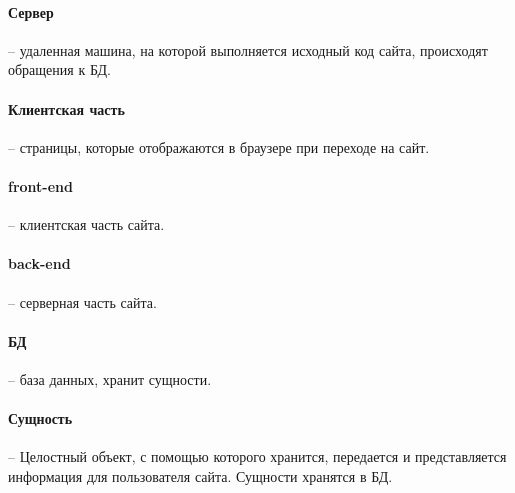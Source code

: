 \paragraph{Сервер} -- удаленная машина, на которой выполняется исходный код сайта, происходят обращения к БД.
\paragraph{Клиентская часть} -- страницы, которые отображаются в браузере при переходе на сайт.
\paragraph{front-end} -- клиентская часть сайта.
\paragraph{back-end} -- серверная часть сайта.
\paragraph{БД} -- база данных, хранит сущности.
\paragraph{Сущность} -- Целостный объект, с помощью которого хранится, передается и представляется информация для пользователя сайта. Сущности хранятся в БД.
